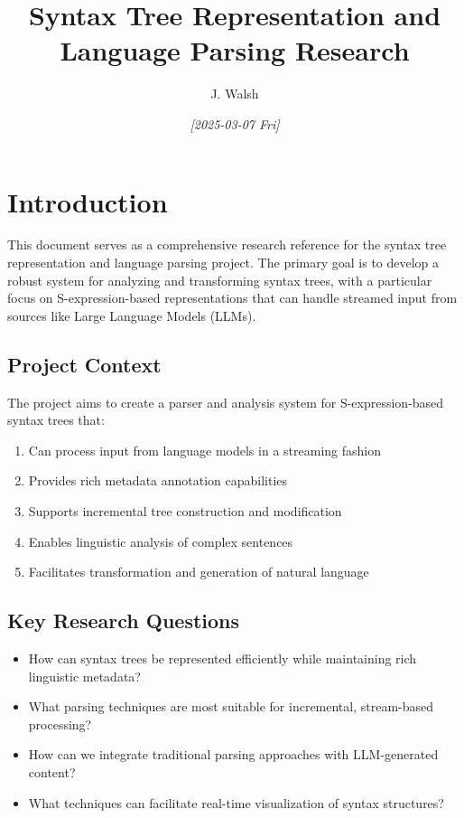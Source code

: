 \documentclass[a4paper,11pt]{article}
\author{J. Walsh}
\date{\textit{{[}2025-03-07 Fri]}}
\title{Syntax Tree Representation and Language Parsing Research}
\begin{document}
\maketitle
\setcounter{tocdepth}{3}
\tableofcontents

\section{Introduction}
\label{sec:org1f7da3b}

This document serves as a comprehensive research reference for the syntax tree representation and language parsing project. The primary goal is to develop a robust system for analyzing and transforming syntax trees, with a particular focus on S-expression-based representations that can handle streamed input from sources like Large Language Models (LLMs).
\subsection{Project Context}
\label{sec:orga80ac33}

The project aims to create a parser and analysis system for S-expression-based syntax trees that:

\begin{enumerate}
\item Can process input from language models in a streaming fashion
\item Provides rich metadata annotation capabilities
\item Supports incremental tree construction and modification
\item Enables linguistic analysis of complex sentences
\item Facilitates transformation and generation of natural language
\end{enumerate}
\subsection{Key Research Questions}
\label{sec:orgbf6db49}

\begin{itemize}
\item How can syntax trees be represented efficiently while maintaining rich linguistic metadata?
\item What parsing techniques are most suitable for incremental, stream-based processing?
\item How can we integrate traditional parsing approaches with LLM-generated content?
\item What techniques can facilitate real-time visualization of syntax structures?
\end{itemize}
\end{document}
